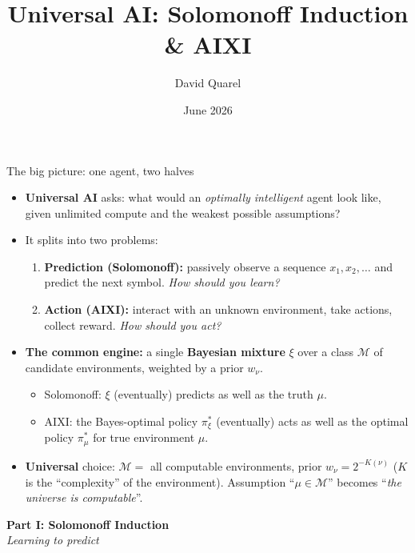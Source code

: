 \documentclass[10pt,aspectratio=169]{beamer}
\newcommand{\cM}{\mathcal{M}}
\begin{document}
\title[Solomonoff \& AIXI: a speedrun]{Universal AI: Solomonoff Induction \& AIXI}
\author[David Quarel]{David Quarel}
\date{June 2026}

\frame{\titlepage}

\begin{frame}{The big picture: one agent, two halves}
\begin{itemize}
    \item \textbf{Universal AI} asks: what would an \emph{optimally intelligent} agent look like, given unlimited compute and the weakest possible assumptions?
    \pause
    \item It splits into two problems:
    \begin{enumerate}
        \item \textbf{Prediction (Solomonoff):} passively observe a sequence $x_1, x_2, \ldots$ and predict the next symbol. \emph{How should you learn?}
        \pause
        \item \textbf{Action (AIXI):} interact with an unknown environment, take actions, collect reward. \emph{How should you act?}
    \end{enumerate}
    \pause
    \item \textbf{The common engine:} a single \textbf{Bayesian mixture} $\xi$ over a class $\cM$ of candidate environments, weighted by a prior $w_\nu$.
    \begin{itemize}
        \item Solomonoff: $\xi$ (eventually) predicts as well as the truth $\mu$.
        \item AIXI: the Bayes-optimal policy $\pi_\xi^*$ (eventually) acts as well as the optimal policy $\pi_\mu^*$ for true environment $\mu$.
    \end{itemize}
    \pause
    \item \textbf{Universal} choice: $\cM=$ all computable environments, prior $w_\nu = 2^{-K(\nu)}$ ($K$ is the ``complexity'' of the environment). Assumption ``$\mu\in\cM$'' becomes ``\emph{the universe is computable}''.
\end{itemize}
\end{frame}

\begin{frame}
    \begin{center}
    {\Huge \textbf{Part I: Solomonoff Induction}}\\[1em]
    {\large \emph{Learning to predict}}\\[2em]
    \end{center}
    \end{frame}
\end{document}
